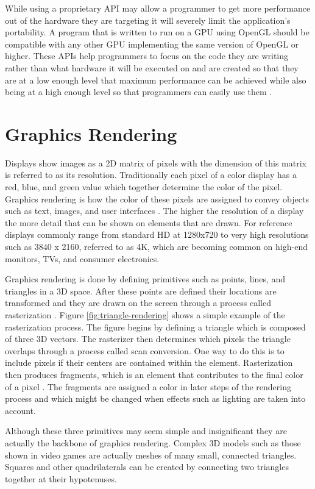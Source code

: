 \documentclass{article}
\begin{document}
While using a proprietary API may allow a programmer to get more performance out of the hardware they are targeting it will severely limit the application's portability. A program that is written to run on a GPU using OpenGL should be compatible with any other GPU implementing the same version of OpenGL or higher. These APIs help programmers to focus on the code they are writing rather than what hardware it will be executed on and are created so that they are at a low enough level that maximum performance can be achieved while also being at a high enough level so that programmers can easily use them \cite[p.~4]{sellers2016}.

\section{Graphics Rendering}
Displays show images as a 2D matrix of pixels with the dimension of this matrix is referred to as its resolution. Traditionally each pixel of a color display has a red, blue, and green value which together determine the color of the pixel. Graphics rendering is how the color of these pixels are assigned to convey objects such as text, images, and user interfaces \cite{mckesson2018}. The higher the resolution of a display the more detail that can be shown on elements that are drawn. For reference displays commonly range from standard HD at 1280x720 to very high resolutions such as 3840 x 2160, referred to as 4K, which are becoming common on high-end monitors, TVs, and consumer electronics.

Graphics rendering is done by defining primitives such as points, lines, and triangles in a 3D space. After these points are defined their locations are transformed and they are drawn on the screen through a process called rasterization \cite{mckesson2018}. Figure \ref{fig:triangle-rendering} shows a simple example of the rasterization process. The figure begins by defining a triangle which is composed of three 3D vectors. The rasterizer then determines which pixels the triangle overlaps through a process called scan conversion. One way to do this is to include pixels if their centers are contained within the element. Rasterization then produces fragments, which is an element that contributes to the final color of a pixel \cite{sellers2016}. The fragments are assigned a color in later steps of the rendering process and which might be changed when effects such as lighting are taken into account.

Although these three primitives may seem simple and insignificant they are actually the backbone of graphics rendering. Complex 3D models such as those shown in video games are actually meshes of many small, connected triangles. Squares and other quadrilaterals can be created by connecting two triangles together at their hypotenuses.
\end{document}
